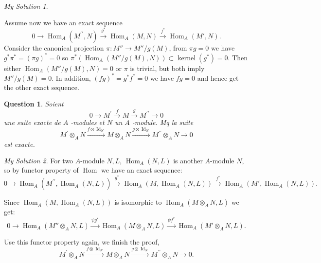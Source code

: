 \documentclass[]{article}
\newtheorem{prop}{Question}
\theoremstyle{remark}
\newtheorem*{sol}{My Solution}
\begin{document}
\begin{sol}
\begin{enumerate}
		  Assume now we have an exact sequence
		  \[ 0 \longrightarrow \operatorname{Hom}_{A}\left(M^{\prime \prime}, N\right) \stackrel{g^{*}}{\longrightarrow} \operatorname{Hom}_{A}\left(M, N\right) \stackrel{f^{*}}{\longrightarrow} \operatorname{Hom}_{A}(M', N). \]
		  Consider the canonical projection $ \pi: M'' \rightarrow M''/g(M) $,  from $ \pi g =0 $ we have $ g^* \pi^* = (\pi g)^* =0 $ so $ \pi^*(\operatorname{Hom}_{A}(M''/g(M), N)) \subset \operatorname{kernel}(g^*) = 0 $. Then either $ \operatorname{Hom}_{A}(M''/g(M), N) =0 $ or $ \pi $ is trivial, but both imply  $ M''/g(M) =0 $. In addition, $ (fg)^* = g^* f^* = 0 $ we have $ fg =0 $ and hence get the other exact sequence.
	\end{enumerate}
\end{sol}
\begin{prop}
	 Soient
	\[ 0 \longrightarrow M^{\prime} \stackrel{f}{\longrightarrow} M \stackrel{g}{\longrightarrow} M^{\prime \prime} \longrightarrow 0 \] une suite exacte de $A$ -modules et $N$ un $A$ -module. Mq la suite
	\[ M^{\prime} \otimes_{A} N \stackrel{f\otimes \operatorname{Id}_N}{\longrightarrow} M \otimes_{A} N \stackrel{g\otimes \operatorname{Id}_N}{\longrightarrow} M^{\prime \prime} \otimes_{A} N \longrightarrow 0 \] est exacte.
\end{prop}
\begin{sol}
	For two $ A $-module $ N, L $, $ \operatorname{Hom}_{A}\left(N, L\right) $ is another $ A $-module $ N $, so by functor property of  $ \operatorname{Hom} $ we have an exact sequence:
	 \[ 0 \longrightarrow \operatorname{Hom}_{A}\left(M^{\prime \prime}, \operatorname{Hom}_{A}\left(N, L\right)\right) \stackrel{g^{*}}{\longrightarrow} \operatorname{Hom}_{A}\left(M, \operatorname{Hom}_{A}\left(N, L\right)\right) \stackrel{f^{*}}{\longrightarrow} \operatorname{Hom}_{A}(M', \operatorname{Hom}_{A}\left(N, L\right)). \]
	 
	 Since $ \operatorname{Hom}_{A}\left(M, \operatorname{Hom}_{A}\left(N, L\right)\right) $ is isomorphic to $ \operatorname{Hom}_{A}\left(M \otimes_{A} N, L\right) $ we get:
	 	\[ 0 \longrightarrow \operatorname{Hom}_{A}\left(M'' \otimes_{A} N, L\right) \stackrel{\psi g^{*}}{\longrightarrow} \operatorname{Hom}_{A}\left(M \otimes_{A} N, L\right) \stackrel{\psi f^{*}}{\longrightarrow} \operatorname{Hom}_{A}\left(M' \otimes_{A} N, L\right). \]
	 	
	 Use this functor property again, we finish the proof,
	 \[ M^{\prime} \otimes_{A} N \stackrel{f\otimes \operatorname{Id}_N}{\longrightarrow} M \otimes_{A} N \stackrel{g\otimes \operatorname{Id}_N}{\longrightarrow} M^{\prime \prime} \otimes_{A} N \longrightarrow 0 .\]
	 
\end{sol}
\end{document}
